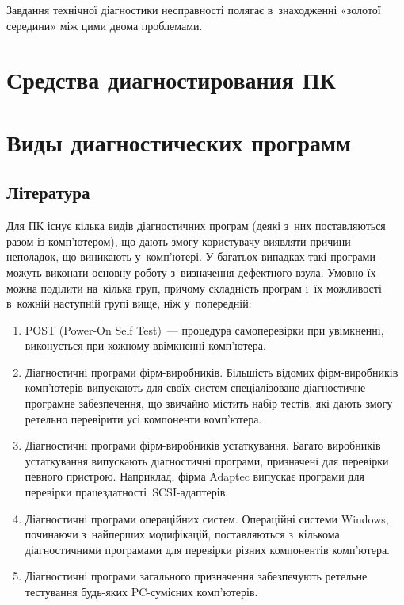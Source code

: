 \documentclass[
	a4paper,
	oneside,
	DIV = 14,
	fontsize = 14pt,
	headings = normal,
]{scrartcl}
\begin{document}
			Завдання технічної діагностики несправності полягає в~знаходженні «золотої середини» між цими двома проблемами. 

	\section{Средства диагностирования ПК}

	\section{Виды диагностических программ}
		\subsection{Література}
			Для ПК існує кілька видів діагностичних програм (деякі з~них поставляються разом із комп'ютером), що дають змогу користувачу виявляти причини неполадок, що виникають у~комп'ютері. У багатьох випадках такі програми можуть виконати основну роботу з~визначення дефектного взула. Умовно їх можна поділити на~кілька груп, причому складність програм і~їх можливості в~кожній наступній групі вище, ніж у~попередній:
			\begin{enumerate}
				\item \textenglish{POST} (\textenglish{Power-On Self Test})~— процедура самоперевірки при увімкненні, виконується при кожному ввімкненні комп'\-юте\-ра.
				\item Діагностичні програми фірм-ви\-роб\-ни\-ків. Більшість відомих фірм-ви\-роб\-ни\-ків ком\-п'\-юте\-рів випускають для своїх систем спеціалізоване діагностичне програмне забезпечення, що звичайно містить набір тестів, які дають змогу ретельно перевірити усі компоненти ком\-п'\-юте\-ра.
				\item Діагностичні програми фірм-виробників устаткування. Багато виробників устаткування випускають діагностичні програми, призначені для перевірки певного пристрою. Наприклад, фірма \textenglish{Adaptec} випускає програми для перевірки працездатності~\textenglish{SCSI}-адаптерів.
				\item Діагностичні програми операційних систем. Операційні системи \textenglish{Windows}, починаючи з~найперших модифікацій, поставляються з~кількома діагностичними програмами для перевірки різних компонентів ком\-п'\-юте\-ра.
				\item Діагностичні програми загального призначення забезпечують ретельне тестування будь-яких \textenglish{PC}-сумісних ком\-п'юте\-рів.
			\end{enumerate}
\end{document}

